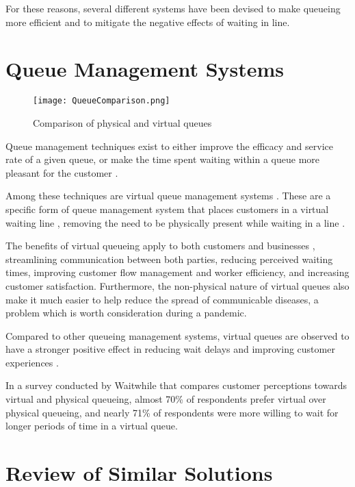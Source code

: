 For these reasons, several different systems have been devised to make queueing more efficient and to mitigate the negative effects of waiting in line.

\section{Queue Management Systems}

\begin{figure}[h]                %
   \centering                    
   \caption{Comparison of physical and virtual queues}
   \texttt{[image: QueueComparison.png]}       
    \label{fig:queuecomparison}
\end{figure}

Queue management techniques exist to either improve the efficacy and service rate of a given queue, or make the time spent waiting within a queue more pleasant for the customer \cite{norman2008psychology}. 

Among these techniques are virtual queue management systems \cite{mwangi2013reducing}. These are a specific form of queue management system that places customers in a virtual waiting line \cite{thamrin2020qmatic}, removing the need to be physically present while waiting in a line \cite{waitwhile2022survey}. 

The benefits of virtual queueing apply to both customers and businesses \cite{thamrin2020qmatic}, streamlining communication between both parties, reducing perceived waiting times, improving customer flow management and worker efficiency, and increasing customer satisfaction. Furthermore, the non-physical nature of virtual queues also make it much easier to help reduce the spread of communicable diseases, a problem which is worth consideration during a pandemic. 

Compared to other queueing management systems, virtual queues are observed to have a stronger positive effect in reducing wait delays and improving customer experiences \cite{mwangi2013reducing}.

In a survey conducted by Waitwhile \cite{waitwhile2022survey} that compares customer perceptions towards virtual and physical queueing, almost 70\% of respondents prefer virtual over physical queueing, and nearly 71\% of respondents were more willing to wait for longer periods of time in a virtual queue. 

\section{Review of Similar Solutions}

